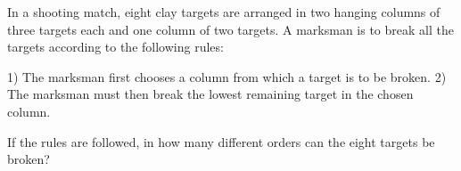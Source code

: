 In a shooting match, eight clay targets are arranged in two hanging columns of three targets each and one column of two targets. A marksman is to break all the targets according to the following rules:

1) The marksman first chooses a column from which a target is to be broken.
2) The marksman must then break the lowest remaining target in the chosen column.

If the rules are followed, in how many different orders can the eight targets be broken?